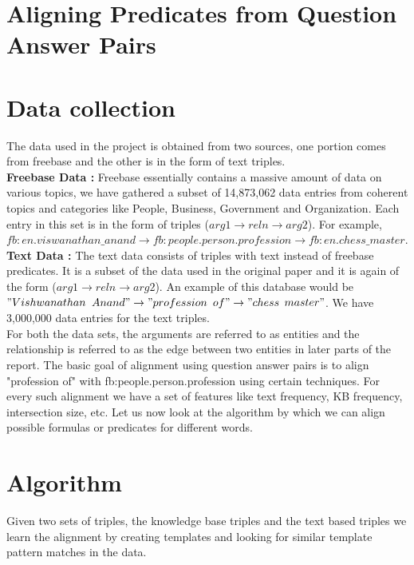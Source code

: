 \documentclass[12pt, a4paper]{article}
\begin{document}
\section{Aligning Predicates from Question Answer Pairs}



\section{Data collection}
The data used in the project is obtained from two sources, one portion comes from freebase and the other is in the form of text triples.\\

{\bf Freebase Data : }Freebase essentially contains a massive amount of data on various topics, we have gathered a subset of 14,873,062 data entries from coherent topics and categories like People, Business, Government and Organization. Each entry in this set is in the form of triples ($arg1\rightarrow reln \rightarrow arg2$). For example, $fb:en.viswanathan\_anand \rightarrow	fb:people.person.profession \rightarrow	fb:en.chess\_master$. \\

{\bf Text Data : }The text data consists of triples with text instead of freebase predicates. It is a subset of the data used in the original paper and it is again of the form ($arg1\rightarrow reln \rightarrow arg2$). An example of this database would be $"Vishwanathan$ $Anand" \rightarrow "profession$ $of" \rightarrow "chess$ $master"$. We have 3,000,000 data entries for the text triples.\\

For both the data sets, the arguments are referred to as entities and the relationship is referred to as the edge between two entities in later parts of the report. The basic goal of alignment using question answer pairs is to align "profession of" with fb:people.person.profession using certain techniques. For every such alignment we have a set of features like text frequency, KB frequency, intersection size, etc.
Let us now look at the algorithm by which we can align possible formulas or predicates for different words.

\section{Algorithm}
Given two sets of triples, the knowledge base triples and the text based triples we learn the alignment by creating templates and looking for similar template pattern matches in the data.\\
\end{document}
